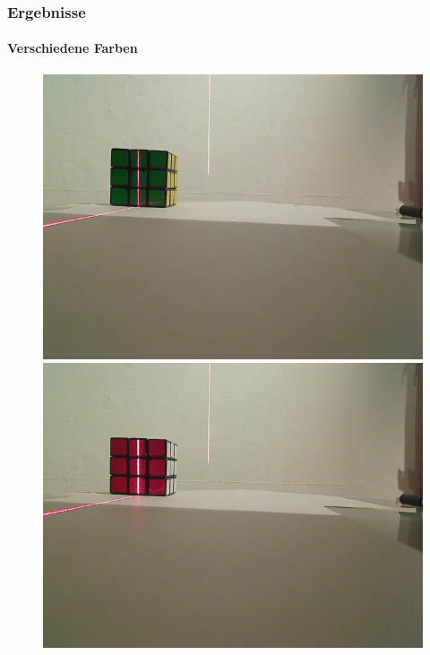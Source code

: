 \documentclass[xcolor=dvipsnames]{beamer}
\begin{document}
\begin{frame}
	\frametitle{Ergebnisse}
	\framesubtitle{Verschiedene Farben}

	\begin{figure}
		\begin{minipage}{0.32\linewidth}
			\includegraphics[width=\linewidth]{includes/test_color_1}
		\end{minipage}
		\hfill
		\begin{minipage}{0.32\linewidth}
			\includegraphics[width=\linewidth]{includes/test_color_2}

\end{minipage}
\end{figure}
\end{frame}
\end{document}
